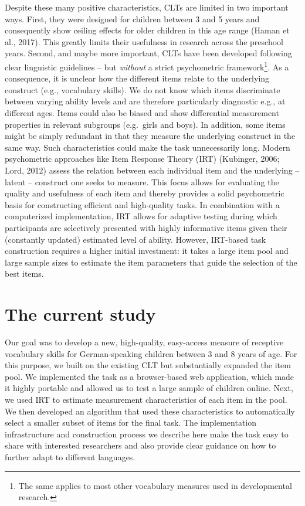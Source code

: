 \documentclass[
  man,floatsintext]{apa6}
\begin{document}
Despite these many positive characteristics, CLTs are limited in two important ways. First, they were designed for children between 3 and 5 years and consequently show ceiling effects for older children in this age range (Haman et al., 2017). This greatly limits their usefulness in research across the preschool years. Second, and maybe more important, CLTs have been developed following clear linguistic guidelines -- but \emph{without} a strict psychometric framework\footnote{The same applies to most other vocabulary measures used in developmental research.}. As a consequence, it is unclear how the different items relate to the underlying construct (e.g., vocabulary skills). We do not know which items discriminate between varying ability levels and are therefore particularly diagnostic e.g., at different ages. Items could also be biased and show differential measurement properties in relevant subgroups (e.g.~girls and boys). In addition, some items might be simply redundant in that they measure the underlying construct in the same way. Such characteristics could make the task unnecessarily long. Modern psychometric approaches like Item Response Theory (IRT) (Kubinger, 2006; Lord, 2012) assess the relation between each individual item and the underlying -- latent -- construct one seeks to measure. This focus allows for evaluating the quality and usefulness of each item and thereby provides a solid psychometric basis for constructing efficient and high-quality tasks. In combination with a computerized implementation, IRT allows for adaptive testing during which participants are selectively presented with highly informative items given their (constantly updated) estimated level of ability. However, IRT-based task construction requires a higher initial investment: it takes a large item pool and large sample sizes to estimate the item parameters that guide the selection of the best items.

\hypertarget{the-current-study}{%
\section{The current study}\label{the-current-study}}

Our goal was to develop a new, high-quality, easy-access measure of receptive vocabulary skills for German-speaking children between 3 and 8 years of age. For this purpose, we built on the existing CLT but substantially expanded the item pool. We implemented the task as a browser-based web application, which made it highly portable and allowed us to test a large sample of children online. Next, we used IRT to estimate measurement characteristics of each item in the pool. We then developed an algorithm that used these characteristics to automatically select a smaller subset of items for the final task. The implementation infrastructure and construction process we describe here make the task easy to share with interested researchers and also provide clear guidance on how to further adapt to different languages.
\end{document}
